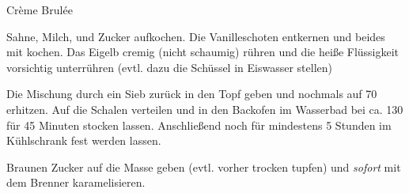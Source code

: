 \begin{recipe}{Crème Brulée}{}
  \label{Crème Brulée}
  \inglist

  \steps
  Sahne, Milch, und Zucker aufkochen. Die Vanilleschoten entkernen und beides mit kochen. Das Eigelb cremig (nicht schaumig) rühren und die heiße Flüssigkeit vorsichtig unterrühren (evtl. dazu die Schüssel in Eiswasser stellen)

  Die Mischung durch ein Sieb zurück in den Topf geben und nochmals auf 70 \celsius erhitzen. Auf die Schalen verteilen und in den Backofen im Wasserbad bei ca. 130 \celsius für 45 Minuten stocken lassen. Anschließend noch für mindestens 5 Stunden im Kühlschrank fest werden lassen.

  Braunen Zucker auf die Masse geben (evtl. vorher trocken tupfen) und \emph{sofort} mit dem Brenner karamelisieren.
\end{recipe}
